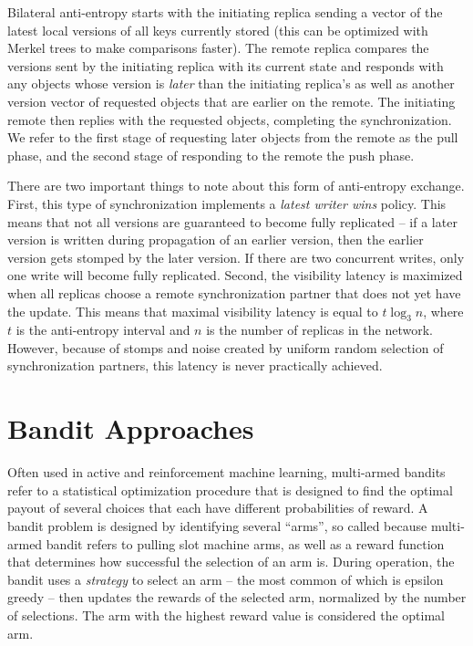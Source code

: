 Bilateral anti-entropy starts with the initiating replica sending a vector of
the latest local versions of all keys currently stored (this can be optimized
with Merkel trees to make comparisons faster).
The remote replica compares the versions sent by the initiating replica with
its current state and responds with any objects whose version is
\textit{later} than the initiating replica's as well as another version
vector of requested objects that are earlier on the remote.
The initiating remote then replies with the requested objects, completing the
synchronization.
We refer to the first stage of requesting later objects from the remote as
the pull phase, and the second stage of responding to the remote the push
phase.

There are two important things to note about this form of anti-entropy
exchange.
First, this type of synchronization implements a \textit{latest writer wins}
policy.
This means that not all versions are guaranteed to become fully replicated
-- if a later version is written during propagation of an earlier version,
then the earlier version gets stomped by the later version.
If there are two concurrent writes, only one write will become fully
replicated.
Second, the visibility latency is maximized when all replicas choose a remote
synchronization partner that does not yet have the update.
This means that maximal visibility latency is equal to $t\log_3n$, where
$t$ is the anti-entropy interval and $n$ is the number of replicas in the
network.
However, because of stomps and noise created by uniform random selection of
synchronization partners, this latency is never practically achieved.

\section*{Bandit Approaches}

Often used in active and reinforcement machine learning, multi-armed bandits
refer to a statistical optimization procedure that is
designed to find the optimal payout of several choices that each have
different probabilities of reward.
A bandit problem is designed by identifying several ``arms'', so called
because multi-armed bandit refers to pulling slot machine arms, as well as a
reward function that determines how successful the selection of an arm is.
During operation, the bandit uses a \textit{strategy} to select an arm -- the
most common of which is epsilon greedy -- then updates the rewards of the
selected arm, normalized by the number of selections.
The arm with the highest reward value is considered the optimal arm.

